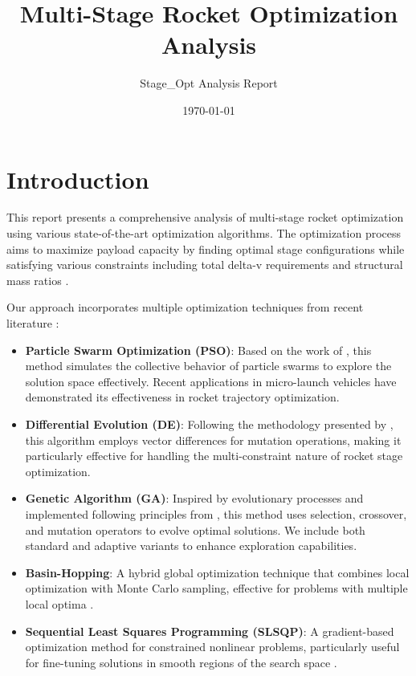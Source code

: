 \documentclass[11pt]{article}
\title{Multi-Stage Rocket Optimization Analysis}
\author{Stage\_Opt Analysis Report}
\date{\today}
\begin{document}
\maketitle

\section{Introduction}
This report presents a comprehensive analysis of multi-stage rocket optimization using various state-of-the-art optimization algorithms. The optimization process aims to maximize payload capacity by finding optimal stage configurations while satisfying various constraints including total delta-v requirements and structural mass ratios \cite{pso_ascent_2013}.

Our approach incorporates multiple optimization techniques from recent literature \cite{evolutionary_rocket_2022,de_ascent_2021}:

\begin{itemize}
    \item \textbf{Particle Swarm Optimization (PSO)}: Based on the work of \cite{pso_ascent_2013}, this method simulates the collective behavior of particle swarms to explore the solution space effectively. Recent applications in micro-launch vehicles \cite{pso_micro_launch_2012} have demonstrated its effectiveness in rocket trajectory optimization.
    
    \item \textbf{Differential Evolution (DE)}: Following the methodology presented by \cite{de_ascent_2021}, this algorithm employs vector differences for mutation operations, making it particularly effective for handling the multi-constraint nature of rocket stage optimization.
    
    \item \textbf{Genetic Algorithm (GA)}: Inspired by evolutionary processes and implemented following principles from \cite{evolutionary_rocket_2022}, this method uses selection, crossover, and mutation operators to evolve optimal solutions. We include both standard and adaptive variants to enhance exploration capabilities.
    
    \item \textbf{Basin-Hopping}: A hybrid global optimization technique that combines local optimization with Monte Carlo sampling, effective for problems with multiple local optima \cite{pso_micro_launch_2012}.
    
    \item \textbf{Sequential Least Squares Programming (SLSQP)}: A gradient-based optimization method for constrained nonlinear problems, particularly useful for fine-tuning solutions in smooth regions of the search space \cite{de_ascent_2021}.
\end{itemize}
\end{document}
